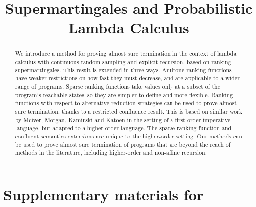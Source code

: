 \documentclass[conference]{IEEEtran}
\begin{document}
\title{Supermartingales and Probabilistic Lambda Calculus}


\maketitle

\begin{abstract}
We introduce a method for proving almost sure termination in the context of lambda calculus with continuous random sampling and explicit recursion, based on ranking supermartingales. 
This result is extended in three ways. 
Antitone ranking functions have weaker restrictions on how fast they must decrease, and are applicable to a wider range of programs. 
Sparse ranking functions take values only at a subset of the program's reachable states, so they are simpler to define and more flexible. 
Ranking functions with respect to alternative reduction strategies can be used to prove almost sure termination,
thanks to a restricted confluence result.
This is based on similar work by Mciver, Morgan, Kaminski and Katoen in the setting of a first-order imperative language, but adapted to a higher-order language.
The sparse ranking function and confluent semantics extensions are unique to the higher-order setting.
Our methods can be used to prove almost sure termination of programs that are beyond the reach of methods in the literature, including higher-order and non-affine recursion.
\end{abstract}


\IEEEpeerreviewmaketitle

















\appendices

\section{Supplementary materials for }
\end{document}
